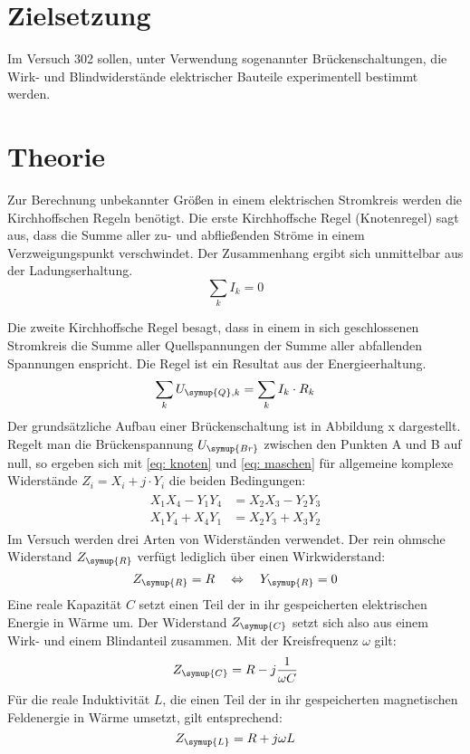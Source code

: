 \section*{Zielsetzung}
Im Versuch 302 sollen, unter Verwendung sogenannter Brückenschaltungen, die Wirk- und Blindwiderstände
 elektrischer Bauteile experimentell bestimmt werden.
\section{Theorie}
Zur Berechnung unbekannter Größen in einem elektrischen Stromkreis werden die Kirchhoffschen Regeln
benötigt. Die erste Kirchhoffsche Regel (Knotenregel) sagt aus, dass die Summe aller zu- und abfließenden
Ströme in einem Verzweigungspunkt verschwindet. Der Zusammenhang ergibt sich unmittelbar aus der Ladungserhaltung.
\begin{equation}
  \sum_k I_k = 0
  \label{eq: knoten}
\end{equation}

Die zweite Kirchhoffsche Regel besagt, dass in einem in sich geschlossenen Stromkreis
die Summe aller Quellspannungen der Summe aller abfallenden
Spannungen enspricht. Die Regel ist ein Resultat aus der Energieerhaltung.
\begin{equation}
  \sum_k U_{\symup{Q},k} = \sum_k I_k \cdot R_k
  \label{eq: maschen}
\end{equation}
Der grundsätzliche Aufbau einer Brückenschaltung ist in Abbildung x dargestellt. Regelt man die Brückenspannung $U_{\symup{Br}}$
zwischen den Punkten A und B auf null, so ergeben sich mit \eqref{eq: knoten} und \eqref{eq: maschen}
für allgemeine komplexe Widerstände $Z_i = X_i + j \cdot Y_i$ die
beiden Bedingungen:
\begin{align}
  \begin{aligned}
    X_1 X_4 - Y_1 Y_4 &= X_2 X_3 - Y_2 Y_3 \\
    X_1 Y_4 + X_4 Y_1 &= X_2 Y_3 + X_3 Y_2
  \end{aligned}
  \label{eq: widerstandsbedingungen}
\end{align}
Im Versuch werden drei Arten von Widerständen verwendet. Der rein ohmsche Widerstand
$Z_{\symup{R}}$ verfügt lediglich über einen Wirkwiderstand:
\begin{equation}
 Z_{\symup{R}} = R \quad \Leftrightarrow \quad Y_{\symup{R}} = 0
\end{equation}
Eine reale Kapazität $C$ setzt einen Teil der in ihr gespeicherten elektrischen Energie
in Wärme um. Der Widerstand $Z_{\symup{C}}$ setzt sich also aus einem Wirk- und einem Blindanteil zusammen. Mit der Kreisfrequenz $\omega$ gilt:
\begin{equation}
  Z_{\symup{C}} = R - j \frac{1}{\omega C}
\end{equation}
Für die reale Induktivität $L$, die einen Teil der in ihr
gespeicherten magnetischen Feldenergie in Wärme umsetzt, gilt entsprechend:
\begin{equation}
  Z_{\symup{L}} = R + j \omega L
\end{equation}

